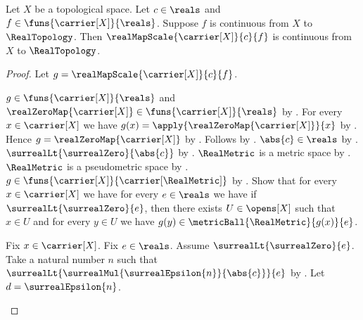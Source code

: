 \begin{theorem}\label{real_map_scale_continuous}
    Let $X$ be a topological space.
    Let $c\in\reals$ and $f\in\funs{\carrier[X]}{\reals}$.
    Suppose $f$ is continuous from $X$ to $\RealTopology$.
    Then $\realMapScale{\carrier[X]}{c}{f}$ is continuous from $X$ to
        $\RealTopology$.
\end{theorem}
\begin{proof}
    Let $g=\realMapScale{\carrier[X]}{c}{f}$.
    \begin{byCase}
            $g\in\funs{\carrier[X]}{\reals}$ and
                $\realZeroMap{\carrier[X]}\in
                    \funs{\carrier[X]}{\reals}$
                by .
            For every $x\in\carrier[X]$ we have
                $g(x)=\apply{\realZeroMap{\carrier[X]}}{x}$
                by
                .
            Hence $g=\realZeroMap{\carrier[X]}$
                by .
            Follows by .
            $\abs{c}\in\reals$
                by .
            $\surrealLt{\surrealZero}{\abs{c}}$
                by
                .
            $\RealMetric$ is a metric space
                by .
            $\RealMetric$ is a pseudometric space by
                .
            $g\in\funs{\carrier[X]}{\carrier[\RealMetric]}$
                by
                .
            Show that for every $x\in\carrier[X]$ we have
                for every $e\in\reals$ we have if
                    $\surrealLt{\surrealZero}{e}$, then there exists
                    $U\in\opens[X]$ such that $x\in U$ and
                    for every $y\in U$ we have
                        $g(y)\in\metricBall{\RealMetric}{g(x)}{e}$.
            \begin{subproof}
                Fix $x\in\carrier[X]$.
                Fix $e\in\reals$.
                Assume $\surrealLt{\surrealZero}{e}$.
                Take a natural number $n$ such that
                    $\surrealLt{
                        \surrealMul{\surrealEpsilon{n}}{\abs{c}}}{e}$
                    by .
                Let $d=\surrealEpsilon{n}$.

\end{subproof}
\end{byCase}
\end{proof}
